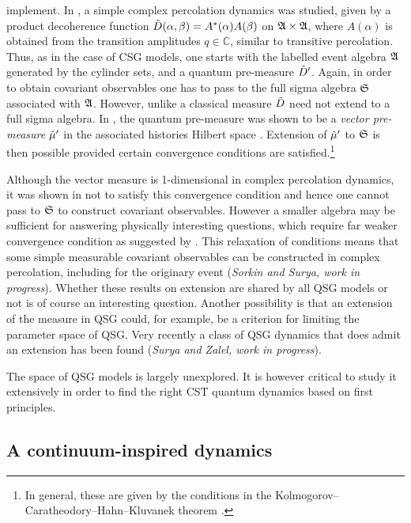   implement.  In \cite{djs}, a simple complex percolation dynamics was studied, given by a product decoherence function
  $\tilde D(\alpha, \beta) =A^*(\alpha) A(\beta)$ on $\mathfrak A\times \mathfrak A$, where $A(\alpha)$ is obtained from the transition
  amplitudes $q \in \mathbb C$, similar to transitive percolation.  Thus, as in the case of CSG models, one starts with
  the labelled event algebra $\mathfrak A$ generated by the cylinder sets, and a quantum pre-measure $\tilde D'$.  Again, in order to
  obtain covariant observables one has to pass to the full sigma algebra $\mathfrak S$ associated with $\mathfrak A$.  However, unlike a
  classical measure $\tilde D$ need not extend to a full sigma algebra.  In \cite{djs}, the quantum pre-measure was shown to
  be a \emph{vector pre-measure} $\hat \mu'$ in the associated histories Hilbert space \citep{hhh}. Extension of $\hat \mu'$ to $\mathfrak S$ is then
  possible provided certain convergence conditions are satisfied.\footnote{In general, these are given by  the conditions
    in the 
    Kolmogorov--Caratheodory--Hahn--Kluvanek theorem \citep{du}.} 

Although the vector measure is 1-dimensional in   complex percolation dynamics, it  was shown in \cite{djs}  not to
satisfy this  convergence condition and hence one cannot pass to $\mathfrak S$ to construct  covariant observables.
However a
smaller algebra may be sufficient for answering physically interesting questions, which require far weaker 
convergence condition as suggested by \cite{ec}. This relaxation of conditions means that some simple measurable covariant
observables can be constructed in complex percolation, including for the originary event ({\it Sorkin and Surya, work in progress}).  Whether these
results on extension are shared by  all QSG models  or not is of course an interesting question. Another possibility is
that an extension of the
measure in QSG could,   for example,  be a criterion for limiting the parameter space of QSG. Very recently a class of
QSG 
dynamics that does admit an extension  has been found ({\it Surya and Zalel, work in progress}). 

 The space of QSG models is largely unexplored. It is however critical to study it extensively in order to find the
 right CST  quantum dynamics based on first principles. 






\subsection{A continuum-inspired dynamics} 
\label{ssec:partn}

